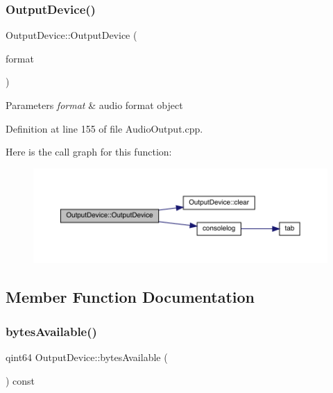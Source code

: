 \subsubsection{\texorpdfstring{Output\+Device()}{OutputDevice()}}
{\footnotesize\ttfamily Output\+Device\+::\+Output\+Device (\begin{DoxyParamCaption}\item[{Q\+Audio\+Format}]{format }\end{DoxyParamCaption})}


\begin{DoxyParams}{Parameters}
{\em format} & audio format object \\
\hline
\end{DoxyParams}


Definition at line 155 of file Audio\+Output.\+cpp.

Here is the call graph for this function\+:
\nopagebreak
\begin{figure}[H]
\begin{center}
\leavevmode
\includegraphics[width=350pt]{class_output_device_aa1e4dbe8403fb3fc022f71e3e3c26ee7_cgraph}
\end{center}
\end{figure}


\subsection{Member Function Documentation}
\mbox{\label{class_output_device_ae15675354b4b09ca3ff02a24be102c4d}} 
\subsubsection{\texorpdfstring{bytes\+Available()}{bytesAvailable()}}
{\footnotesize\ttfamily qint64 Output\+Device\+::bytes\+Available (\begin{DoxyParamCaption}{ }\end{DoxyParamCaption}) const}

